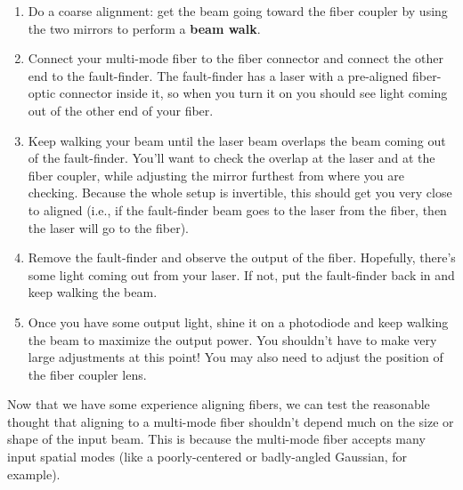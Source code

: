 \documentclass[]{manual}
\begin{document}
    \begin{enumerate}
        \item Do a coarse alignment: get the beam going toward the fiber coupler by using the two mirrors to perform a \textbf{beam walk}.
        \item Connect your multi-mode fiber to the fiber connector and connect the other end to the fault-finder.
        The fault-finder has a laser with a pre-aligned fiber-optic connector inside it, so when you turn it on you should see light coming out of the other end of your fiber.
        \item Keep walking your beam until the laser beam overlaps the beam coming out of the fault-finder.
        You'll want to check the overlap at the laser and at the fiber coupler, while adjusting the mirror furthest from where you are checking.
        Because the whole setup is invertible, this should get you very close to aligned (i.e., if the fault-finder beam goes to the laser from the fiber, then the laser will go to the fiber).
        \item Remove the fault-finder and observe the output of the fiber.
        Hopefully, there's some light coming out from your laser.
        If not, put the fault-finder back in and keep walking the beam.
        \item Once you have some output light, shine it on a photodiode and keep walking the beam to maximize the output power.
        You shouldn't have to make very large adjustments at this point!
        You may also need to adjust the position of the fiber coupler lens.
    \end{enumerate}

    

    Now that we have some experience aligning fibers, we can test the reasonable thought that aligning to a multi-mode fiber shouldn't depend much on the size or shape of the input beam.
    This is because the multi-mode fiber accepts many input spatial modes (like a poorly-centered or badly-angled Gaussian, for example).
\end{document}
